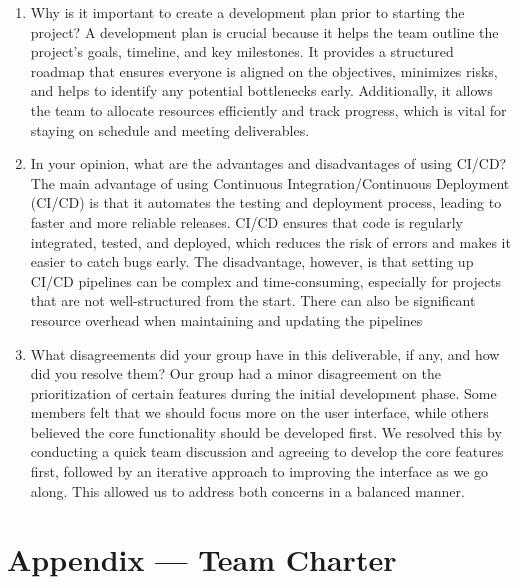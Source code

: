 \documentclass{article}
\begin{document}
\begin{enumerate}
    \item Why is it important to create a development plan prior to starting the
    project?
    A development plan is crucial because it helps the team outline the project’s
    goals, timeline, and key milestones. It provides a structured roadmap that
    ensures everyone is aligned on the objectives, minimizes risks, and helps
    to identify any potential bottlenecks early. Additionally, it allows the team
    to allocate resources efficiently and track progress, which is vital for staying
    on schedule and meeting deliverables.

    \item In your opinion, what are the advantages and disadvantages of using
    CI/CD?
    The main advantage of using Continuous Integration/Continuous Deployment (CI/CD)
    is that it automates the testing and deployment process, leading to faster and 
    more reliable releases. CI/CD ensures that code is regularly integrated, tested,
    and deployed, which reduces the risk of errors and makes it easier to catch bugs early. 
    The disadvantage, however, is that setting up CI/CD pipelines can be complex and 
    time-consuming, especially for projects that are not well-structured from the start. 
    There can also be significant resource overhead when maintaining and updating the pipelines

    \item What disagreements did your group have in this deliverable, if any,
    and how did you resolve them?
    Our group had a minor disagreement on the prioritization of certain features during 
    the initial development phase. Some members felt that we should focus more on the 
    user interface, while others believed the core functionality should be developed first.
    We resolved this by conducting a quick team discussion and agreeing to develop the core
    features first, followed by an iterative approach to improving the interface as we go along.
     This allowed us to address both concerns in a balanced manner.
\end{enumerate}

\newpage{}

\section*{Appendix --- Team Charter}

\end{document}
